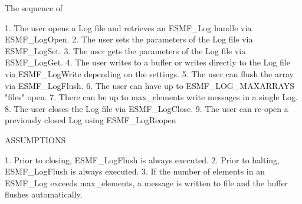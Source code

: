 

The sequence of 

1. The user opens a Log file and retrieves an  ESMF_Log handle via ESMF_LogOpen.
2. The user sets the parameters of the Log file via ESMF_LogSet.
3. The user gets the parameters of the Log file via ESMF_LogGet.
4. The user writes to a buffer or writes directly to the Log file via ESMF_LogWrite depending on the settings.
5. The user can flush the array via ESMF_LogFlush.
6. The user can have up to ESMF_LOG_MAXARRAYS "files" open.
7. There can be up to max_elements write messages in a single Log.
8. The user closes the Log file via ESMF_LogClose.
9. The user can re-open a previously closed Log using ESMF_LogReopen

ASSUMPTIONS

1. Prior to closing, ESMF_LogFlush is always executed.
2. Prior to halting, ESMF_LogFlush is always executed.
3. If the number of elements in an ESMF_Log exceeds max_elements, a message 
   is written to file and the buffer flushes automatically.

